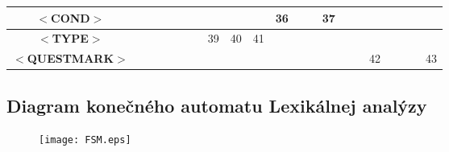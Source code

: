 \documentclass[a4paper,11pt]{article}
\begin{document}
\begin{table}[htbp]
\begin{tabular}{|c||c|c|c|c|c|c|c|c|c|c|c|c|c|c|c|c|c|c|c|c|}
\hline
\textbf{$<$COND$>$}          &                             &                        &                        &                         &                           &                             &                              &                             &                             & \multicolumn{1}{c|}{36}  &                           &                         & \multicolumn{1}{c|}{37}  &                          &                            &                         &                             &                         &                           & \multicolumn{1}{l|}{}  \\ 
\hline
\textbf{$<$TYPE$>$}          &                             &                        &                        &                         &                           &                             & \multicolumn{1}{c|}{39}      & \multicolumn{1}{c|}{40}     & \multicolumn{1}{c|}{41}     &                          &                           &                         &                          &                          &                            &                         &                             &                         &                           & \multicolumn{1}{l|}{}  \\ 
\hline
\textbf{$<$QUESTMARK$>$}     &                             &                        &                        &                         &                           &                             &                              &                             &                             &                          &                           &                         &                          &                          &                            & \multicolumn{1}{c|}{42} &                             &                         &                           & 43                     \\
\hline
\end{tabular}
\end{table}

\newpage

\subsection{Diagram konečného automatu Lexikálnej analýzy}
\begin{figure}[H]
	\centering
	\texttt{[image: FSM.eps]}
\end{figure}
\end{document}
